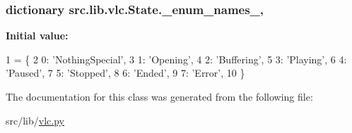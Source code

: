 \subsubsection[{\+\_\+enum\+\_\+names\+\_\+}]{\setlength{\rightskip}{0pt plus 5cm}dictionary src.\+lib.\+vlc.\+State.\+\_\+enum\+\_\+names\+\_\+\hspace{0.3cm}{\ttfamily [static]}, {\ttfamily [private]}}\label{classsrc_1_1lib_1_1vlc_1_1State_a3e2fd195ae0b293c4ed0dd8ecc5d229f}
{\bfseries Initial value\+:}
\begin{DoxyCode}
1 = \{
2         0: \textcolor{stringliteral}{'NothingSpecial'},
3         1: \textcolor{stringliteral}{'Opening'},
4         2: \textcolor{stringliteral}{'Buffering'},
5         3: \textcolor{stringliteral}{'Playing'},
6         4: \textcolor{stringliteral}{'Paused'},
7         5: \textcolor{stringliteral}{'Stopped'},
8         6: \textcolor{stringliteral}{'Ended'},
9         7: \textcolor{stringliteral}{'Error'},
10     \}
\end{DoxyCode}


The documentation for this class was generated from the following file\+:\begin{DoxyCompactItemize}
\item 
src/lib/\hyperlink{vlc_8py}{vlc.\+py}\end{DoxyCompactItemize}
